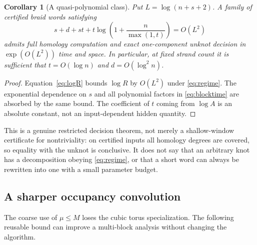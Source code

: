 \documentclass[11pt,letterpaper]{article}
\newtheorem{corollary}[theorem]{Corollary}
\theoremstyle{remark}\newtheorem{remark}[theorem]{Remark}
\begin{document}
\begin{corollary}[A quasi-polynomial class]\label{cor:quasi}
Put $L=\log(n+s+2)$. A family of certified braid words satisfying
\begin{equation}\label{eq:regime}
 s+d+st+t\log\!\left(1+\frac{n}{\max(1,t)}\right)=O(L^2)
\end{equation}
admits full homology computation and exact one-component unknot decision in $\exp(O(L^2))$ time and space. In particular, at fixed strand count it is sufficient that $t=O(\log n)$ and $d=O(\log^2 n)$.
\end{corollary}
\begin{proof}
Equation~\eqref{eq:logR} bounds $\log R$ by $O(L^2)$ under \eqref{eq:regime}. The exponential dependence on $s$ and all polynomial factors in \eqref{eq:blocktime} are absorbed by the same bound. The coefficient of $t$ coming from $\log A$ is an absolute constant, not an input-dependent hidden quantity.
\end{proof}

This is a genuine restricted decision theorem, not merely a shallow-window certificate for nontriviality: on certified inputs all homology degrees are covered, so equality with the unknot is conclusive. It does not say that an arbitrary knot has a decomposition obeying \eqref{eq:regime}, or that a short word can always be rewritten into one with a small parameter budget.

\subsection{A sharper occupancy convolution}
The coarse use of $\mu\le M$ loses the cubic torus specialization. The following reusable bound can improve a multi-block analysis without changing the algorithm.
\end{document}
